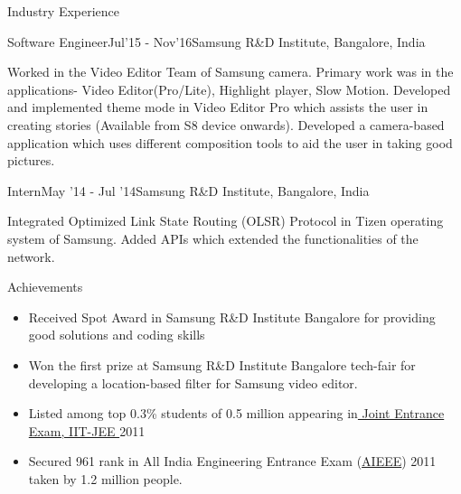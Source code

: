 \documentclass{resume} %
\begin{document}
\vspace*{-1.5mm}
\pagebreak
\begin{rSection}{Industry Experience}
\begin{rSubsection}{Software Engineer}{Jul'15 - Nov'16}{Samsung R\&D Institute, Bangalore, India}{}{}
\item Worked in the Video Editor Team of Samsung camera. Primary work was in the applications- Video Editor(Pro/Lite), Highlight player, Slow Motion. Developed and implemented theme mode in Video Editor Pro which assists the user in creating stories (Available from S8 device onwards). Developed a camera-based application which uses different composition tools to aid the user in taking good pictures.\\
\end{rSubsection}
\vspace*{-3mm}
\begin{rSubsection}{Intern}{May '14 - Jul '14}{Samsung R\&D Institute, Bangalore, India}{}{}
\item Integrated Optimized Link State Routing (OLSR) Protocol in Tizen operating system of Samsung. Added APIs which extended the functionalities of the network.
\end{rSubsection}
\end{rSection}
\vspace*{-1.5mm}
\begin{rSection}{Achievements}

\begin{itemize}[leftmargin=*]
\itemsep -0.5em 
\item Received Spot Award in Samsung R\&D Institute Bangalore for providing good solutions and coding skills
\item Won the first prize at Samsung  R\&D Institute Bangalore tech-fair for developing a location-based filter for Samsung video editor.
\item Listed among top 0.3\% students of 0.5 million appearing in\href{https://en.wikipedia.org/wiki/Joint_Entrance_Examination}{ Joint Entrance Exam, IIT-JEE }
2011
\item Secured 961 rank in All India Engineering Entrance Exam (\href{https://en.wikipedia.org/wiki/Joint_Entrance_Examination_\%E2\%80\%93_Main}{AIEEE}) 2011 taken by 1.2 million people.


\end{itemize}
\end{rSection}
\end{document}
